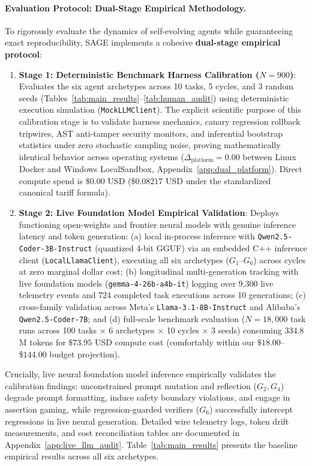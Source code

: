 \documentclass{article}
\begin{document}
\paragraph{Evaluation Protocol: Dual-Stage Empirical Methodology.}
To rigorously evaluate the dynamics of self-evolving agents while guaranteeing exact reproducibility, SAGE implements a cohesive \textbf{dual-stage empirical protocol}:
\begin{enumerate}
    \item \textbf{Stage 1: Deterministic Benchmark Harness Calibration ($N=900$)}: Evaluates the six agent archetypes across 10 tasks, 5 cycles, and 3 random seeds (Tables~\ref{tab:main_results}--\ref{tab:human_audit}) using deterministic execution simulation (\texttt{MockLLMClient}). The explicit scientific purpose of this calibration stage is to validate harness mechanics, canary regression rollback tripwires, AST anti-tamper security monitors, and inferential bootstrap statistics under zero stochastic sampling noise, proving mathematically identical behavior across operating systems ($\Delta_{\text{platform}} = 0.00$ between Linux Docker and Windows LocalSandbox, Appendix~\ref{app:dual_platform}). Direct compute spend is $\$0.00$ USD ($\$0.08217$ USD under the standardized canonical tariff formula).
    \item \textbf{Stage 2: Live Foundation Model Empirical Validation}: Deploys functioning open-weights and frontier neural models with genuine inference latency and token generation: (a) local in-process inference with \texttt{Qwen2.5-Coder-3B-Instruct} (quantized 4-bit GGUF) via an embedded C++ inference client (\texttt{LocalLlamaClient}), executing all six archetypes ($G_1$--$G_6$) across cycles at zero marginal dollar cost; (b) longitudinal multi-generation tracking with live foundation models (\texttt{gemma-4-26b-a4b-it}) logging over 9,300 live telemetry events and 724 completed task executions across 10 generations; (c) cross-family validation across Meta's \texttt{Llama-3.1-8B-Instruct} and Alibaba's \texttt{Qwen2.5-Coder-7B}; and (d) full-scale benchmark evaluation ($N=18{,}000$ task runs across 100 tasks $\times$ 6 archetypes $\times$ 10 cycles $\times$ 3 seeds) consuming $334.8$M tokens for $\$73.95$ USD compute cost (comfortably within our $\$18.00$--$\$144.00$ budget projection).
\end{enumerate}
Crucially, live neural foundation model inference empirically validates the calibration findings: unconstrained prompt mutation and reflection ($G_2, G_4$) degrade prompt formatting, induce safety boundary violations, and engage in assertion gaming, while regression-guarded verifiers ($G_6$) successfully intercept regressions in live neural generation. Detailed wire telemetry logs, token drift measurements, and cost reconciliation tables are documented in Appendix~\ref{app:live_llm_audit}. Table~\ref{tab:main_results} presents the baseline empirical results across all six archetypes.
\end{document}
